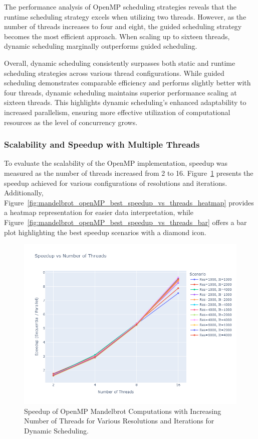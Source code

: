 \documentclass[
	report, %
	11pt, %
]{CSUniSchoolLabReport}
\newcounter{ct}
\begin{document}
The performance analysis of OpenMP scheduling strategies reveals that the runtime scheduling strategy excels when utilizing two threads. However, as the number of threads increases to four and eight, the guided scheduling strategy becomes the most efficient approach. When scaling up to sixteen threads, dynamic scheduling marginally outperforms guided scheduling.

Overall, dynamic scheduling consistently surpasses both static and runtime scheduling strategies across various thread configurations. While guided scheduling demonstrates comparable efficiency and performs slightly better with four threads, dynamic scheduling maintains superior performance scaling at sixteen threads. This highlights dynamic scheduling's enhanced adaptability to increased parallelism, ensuring more effective utilization of computational resources as the level of concurrency grows.


\subsubsection{Scalability and Speedup with Multiple Threads}

To evaluate the scalability of the OpenMP implementation, speedup was measured as the number of threads increased from 2 to 16. Figure~\ref{fig:mandelbrot_openMP_best_speedup_vs_threads} presents the speedup achieved for various configurations of resolutions and iterations. Additionally, Figure~\ref{fig:mandelbrot_openMP_best_speedup_vs_threads_heatmap} provides a heatmap representation for easier data interpretation, while Figure~\ref{fig:mandelbrot_openMP_best_speedup_vs_threads_bar} offers a bar plot highlighting the best speedup scenarios with a diamond icon.

\begin{figure}[H]
	\centering
	\captionsetup{justification=centering, width=.8\linewidth}
	\includegraphics[width=\textwidth]{./img/mandelbrot_openmp_best_speedup_vs_threads.png}
	\caption{Speedup of OpenMP Mandelbrot Computations with Increasing Number of Threads for Various Resolutions and Iterations for Dynamic Scheduling.}
	\label{fig:mandelbrot_openMP_best_speedup_vs_threads}
\end{figure}
\end{document}

